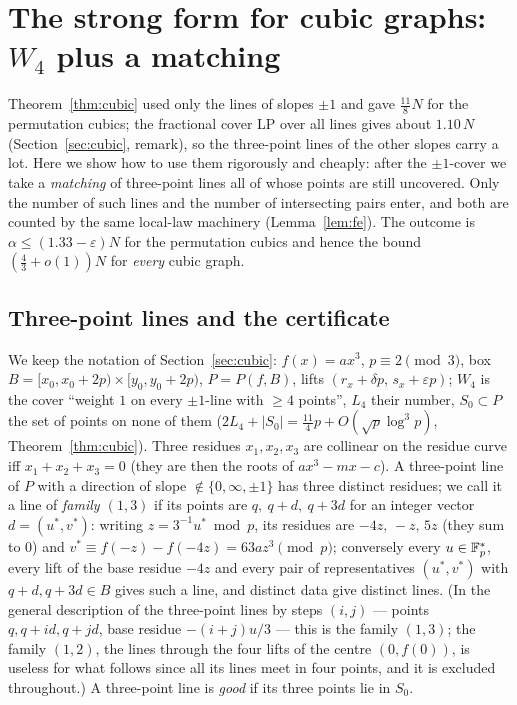 
\section{The strong form for cubic graphs: $W_4$ plus a matching}\label{sec:strong}

Theorem~\ref{thm:cubic} used only the lines of slopes $\pm1$ and gave $\tfrac{11}8N$ for the permutation cubics; the fractional cover LP over all lines
gives about $1.10\,N$ (Section~\ref{sec:cubic}, remark), so the three-point lines of the other slopes carry a lot.  Here we show how to use them
rigorously and cheaply: after the $\pm1$-cover we take a \emph{matching} of three-point lines all of whose points are still uncovered.  Only the number of
such lines and the number of intersecting pairs enter, and both are counted by the same local-law machinery (Lemma~\ref{lem:fe}).  The outcome is
$\alpha\le(1.33-\varepsilon)N$ for the permutation cubics and hence the bound $(\tfrac43+o(1))N$ for \emph{every} cubic graph.

\subsection*{Three-point lines and the certificate}

We keep the notation of Section~\ref{sec:cubic}: $f(x)=ax^3$, $p\equiv2\pmod3$, box $B=[x_0,x_0+2p)\times[y_0,y_0+2p)$, $P=P(f,B)$, lifts
$(r_x+\delta p,\,s_x+\varepsilon p)$; $W_4$ is the cover ``weight $1$ on every $\pm1$-line with $\ge4$ points'', $L_4$ their number, $S_0\subset P$
the set of points on none of them ($2L_4+|S_0|=\tfrac{11}4p+O(\sqrt p\log^3p)$, Theorem~\ref{thm:cubic}).  Three residues $x_1,x_2,x_3$ are collinear on
the residue curve iff $x_1+x_2+x_3=0$ (they are then the roots of $ax^3-mx-c$).  A three-point line of $P$ with a direction of slope $\notin\{0,\infty,\pm1\}$
has three distinct residues; we call it a line of \emph{family $(1,3)$} if its points are $q,\ q+d,\ q+3d$ for an integer vector $d=(u^*,v^*)$: writing
$z=3^{-1}u^*\bmod p$, its residues are $-4z,\,-z,\,5z$ (they sum to $0$) and $v^*\equiv f(-z)-f(-4z)=63az^3\pmod p$; conversely every $u\in\mathbb{F}_p^*$, every lift
of the base residue $-4z$ and every pair of representatives $(u^*,v^*)$ with $q+d,q+3d\in B$ gives such a line, and distinct data give distinct lines.
(In the general description of the three-point lines by steps $(i,j)$ — points $q,q+id,q+jd$, base residue $-(i+j)u/3$ — this is the family $(1,3)$; the
family $(1,2)$, the lines through the four lifts of the centre $(0,f(0))$, is useless for what follows since all its lines meet in four points, and it is
excluded throughout.)  A three-point line is \emph{good}
if its three points lie in $S_0$.

